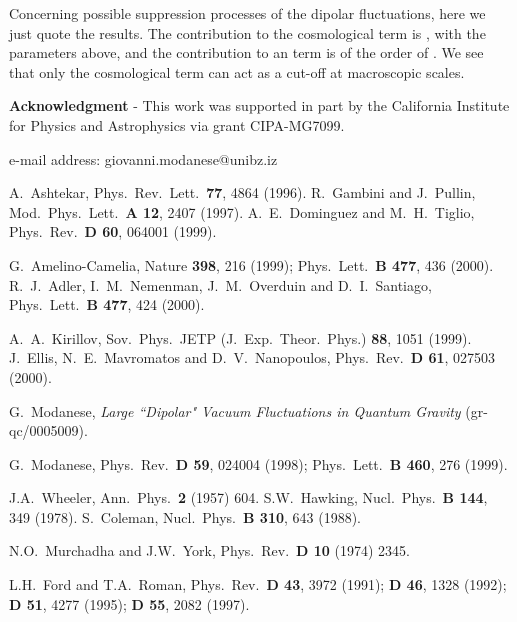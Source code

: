 \documentclass[a4paper,11pt]{article}
\begin{document}
Concerning possible suppression processes of the
dipolar fluctuations, here we just
quote the results. The contribution to the cosmological
term is \coordHE{}, with the parameters above, and the
contribution to an \coordHE{} term is of the order
of \coordHE{}. We see
that only the cosmological term can act as a cut-off at
macroscopic scales.


\medskip
{\bf Acknowledgment} - This work was supported in part by the California Institute for Physics
and Astrophysics via grant CIPA-MG7099.

\medskip
\noindent \myHighlight{$^*$}\coordHE{} e-mail address: giovanni.modanese@unibz.iz


\begin{thebibliography}{9}


A.\ Ashtekar, Phys.\ Rev.\ Lett.\ {\bf 77}, 4864 (1996).
R.\ Gambini and J.\ Pullin, Mod.\ Phys.\ Lett.\ {\bf A 12}, 
2407 (1997).
A.\ E.\ Dominguez and M.\ H.\ Tiglio, Phys.\ Rev.\ 
{\bf D 60}, 064001 (1999).

G.\ Amelino-Camelia, Nature {\bf 398}, 216 (1999); 
Phys.\ Lett.\ {\bf B 477}, 436 (2000).
R.\ J.\ Adler, I.\ M.\ Nemenman, J.\ M.\ Overduin and D.\ 
I.\ Santiago, Phys.\ Lett.\ {\bf B 477}, 424 (2000).

A.\ A.\ Kirillov, Sov.\ Phys.\ JETP (J.\ Exp.\ Theor.\
Phys.) {\bf 88}, 1051 (1999). 
J.\ Ellis, N.\ E.\ Mavromatos and D.\ V.\ Nanopoulos,
Phys.\ Rev.\ {\bf D 61}, 027503 (2000).

\bibitem{vdf}
G.\ Modanese, {\it Large ``Dipolar" Vacuum Fluctuations 
in Quantum Gravity} (gr-qc/0005009).

\bibitem{pre}
G.\ Modanese, Phys.\ Rev.\ {\bf D 59}, 024004 (1998);
Phys.\ Lett.\ {\bf B 460}, 276 (1999).

\bibitem{haw}
J.A.\ Wheeler, Ann.\ Phys.\ {\bf 2} (1957) 604.
S.W.\ Hawking, Nucl.\ Phys.\ {\bf B 144}, 349 (1978). 
S.\ Coleman, Nucl.\ Phys.\ {\bf B 310}, 643 (1988).

\bibitem{mur}
N.O.\ Murchadha and J.W.\ York, Phys.\ Rev.\ {\bf D 10} 
(1974) 2345.


L.H.\ Ford and T.A.\ Roman, Phys.\ Rev.\ {\bf D 43}, 3972 
(1991); {\bf D 46}, 1328 (1992); {\bf D 51}, 4277 (1995); 
{\bf D 55}, 2082 (1997).


\end{thebibliography}
\end{document}
